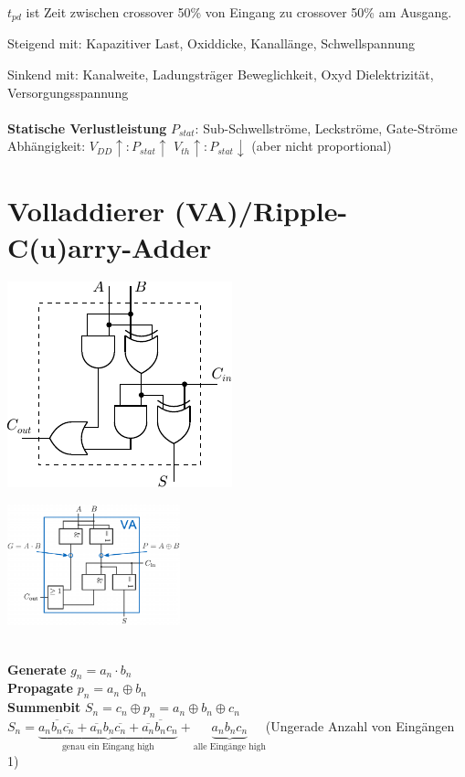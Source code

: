 \documentclass[6pt,a4paper]{scrartcl}
\renewcommand{\emph}[1]{\textsf{\textbf{#1}}}
\newcommand{\ol}[1]{\ensuremath{\overline{#1}}}									%
\begin{document}
\begin{multicols*}{3}
	$t_{pd}$ ist Zeit zwischen crossover 50\% von Eingang zu crossover 50\% am Ausgang.

	Steigend mit: Kapazitiver Last, Oxiddicke, Kanallänge, Schwellspannung

	Sinkend mit: Kanalweite, Ladungsträger Beweglichkeit, Oxyd Dielektrizität, Versorgungsspannung \\ \\
	\emph{Statische Verlustleistung} $P_{stat}$: Sub-Schwellströme, Leckströme, Gate-Ströme
	Abhängigkeit: $V_{DD}\uparrow:P_{stat}\uparrow$ \qquad $V_{th}\uparrow:P_{stat}\downarrow$ \quad (aber nicht proportional)

\section{Volladdierer (VA)/Ripple-C(u)arry-Adder}
\parbox{5.0cm}{ \includegraphics{./img/ds/volladdierer.pdf} }
\hspace*{-.7cm}\parbox{5.0cm}{ \includegraphics[width=5.0cm]{./img/ds/volladdierer-iec.png} } \\
\textbf{Generate} $g_n = a_n \cdot b_n$\\
\textbf{Propagate} $p_n = a_n \oplus b_n$\\
\textbf{Summenbit} $S_n = c_n \oplus p_n= a_n \oplus b_n \oplus c_n$\\
$S_n = \underbrace{a_n\ol{b_n} \ol{c_n} + \ol{a_n}b_n\ol{c_n} + \ol{a_n}\ol{b_n}c_n}_{\text{genau ein Eingang high}} + \underbrace{a_nb_nc_n}_{\text{alle Eingänge high}}$(Ungerade Anzahl von Eingängen 1) \\

\end{multicols*}
\end{document}
